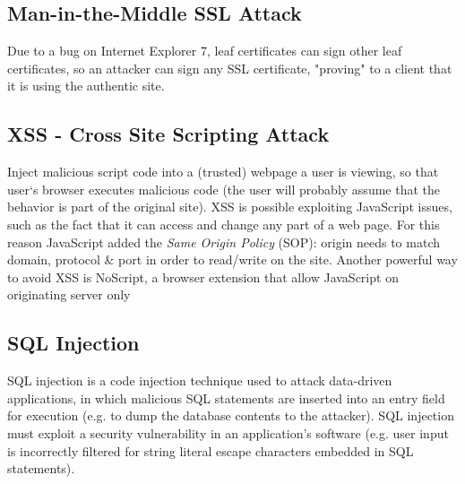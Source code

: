 \subsection{Man-in-the-Middle SSL Attack}
Due to a bug on Internet Explorer 7, leaf certificates can sign other leaf certificates, so an attacker can sign any SSL certificate, "proving" to a client that it is using the authentic site.


\subsection{XSS - Cross Site Scripting Attack}
Inject malicious script code into a (trusted) webpage a user is viewing, so that user‘s browser executes malicious code (the user will probably assume that the behavior is part of the original site). XSS is possible exploiting JavaScript issues, such as the fact that it can access and change any part of a web page. For this reason JavaScript added the \textit{Same Origin Policy} (SOP): origin needs to match domain, protocol \& port in order to read/write on the site.
Another powerful way to avoid XSS is NoScript, a browser extension that allow JavaScript on originating server only


\subsection{SQL Injection}
SQL injection is a code injection technique used to attack data-driven applications, in which malicious SQL statements are inserted into an entry field for execution (e.g. to dump the database contents to the attacker). SQL injection must exploit a security vulnerability in an application's software (e.g. user input is incorrectly filtered for string literal escape characters embedded in SQL statements).